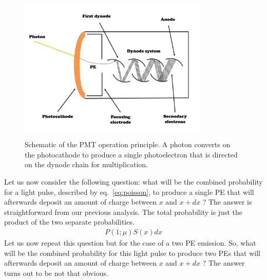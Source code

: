\documentclass[a4paper,11pt]{article}
\begin{document}
\begin{figure}[!t]
\centering
\includegraphics[width=9.0cm, height=7.0cm]{figures/pm.pdf} 
\caption{Schematic of the PMT operation principle.
A photon converts on the photocathode to produce a single photoelectron that is directed on the dynode chain for multiplication. }
\label{fig:pm}
\end{figure}

\enlargethispage{-\baselineskip}
Let us now consider the following question: 
what will be the combined probability for a light pulse, described by eq.~\eqref{eq:poisson}, to produce a single PE that will afterwards deposit an amount of charge between $x$ and $x+dx$ ? 
The answer is straightforward from our previous analysis. The total probability is just the product of the two separate probabilities.
\begin{align}
P(1;\mu) S(x) dx 
\end{align}
Let us now repeat this question but for the case of a two PE emission. 
So, what will be the combined probability for this light pulse to produce two PEs that will afterwards deposit an amount of charge between $x$ and $x + dx$ ? 
The answer turns out to be not that obvious.
\end{document}
